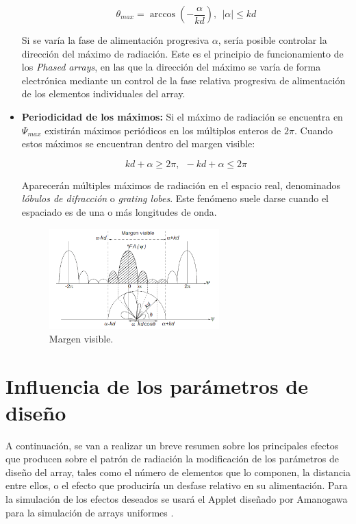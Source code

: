 \begin{itemize}
 \begin{equation}
	\theta_{max}=\arccos(-\frac{\alpha}{kd}),\ \ \left | \alpha \right |\leq kd
	\label{eq:radmax}
\end{equation}

\par Si se varía la fase de alimentación progresiva $\alpha$, sería posible controlar la dirección del máximo de radiación. Este es el principio de funcionamiento de los \textit{Phased arrays}, en las que la dirección del máximo se varía de forma electrónica mediante un control de la fase relativa progresiva de alimentación de los elementos individuales del array. 

\item \textbf{Periodicidad de los máximos: }Si el máximo de radiación se encuentra en $\Psi_{max}$ existirán máximos periódicos en los múltiplos enteros de $2\pi$. Cuando estos máximos se encuentran dentro del margen visible:

\begin{equation}
	kd+\alpha\geq 2\pi,\ \
-kd+\alpha\leq 2\pi  
\label{eq:maxdominio}
\end{equation}


\par Aparecerán múltiples máximos de radiación en el espacio real, denominados \textit{lóbulos de difracción} o \textit{grating lobes}. Este fenómeno suele darse cuando el espaciado es de una o más longitudes de onda.
\begin{figure}[h]
    \centering
        \includegraphics[width=0.62\textwidth]{archivos/array/margen}
        \caption{Margen visible. \cite{Cardama2002}}
        \label{fig:margenvisible}
\end{figure}

\end{itemize}



\newpage
\section{Influencia de los parámetros de diseño}
\par A continuación, se van a realizar un breve resumen sobre los principales efectos que producen sobre el patrón de radiación la modificación de los parámetros de diseño del array, tales como el número de elementos que lo componen, la distancia entre ellos, o el efecto que produciría un desfase relativo en su alimentación. Para la simulación de los efectos deseados se usará el Applet diseñado por Amanogawa para la simulación de arrays uniformes \cite{Amanogawa2019}.

